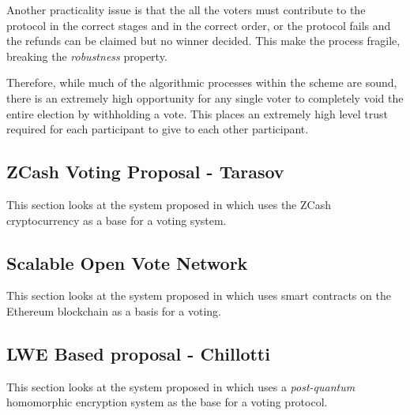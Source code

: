 Another practicality issue is that the all the voters must contribute to the protocol in the correct stages and in the correct order, or the protocol fails and the refunds can be claimed but no winner decided. This make the process fragile, breaking the \emph{robustness} property.

Therefore, while much of the algorithmic processes within the scheme are sound, there is an extremely high opportunity for any single voter to completely void the entire election by withholding a vote. This places an extremely high level trust required for each participant to give to each other participant.

\subsection{ZCash Voting Proposal - Tarasov}

This section looks at the system proposed in \cite{tarasovInternetVotingUsing2017} which uses the ZCash cryptocurrency as a base for a voting system.




\subsection{Scalable Open Vote Network}

This section looks at the system proposed in \cite{seifelnasrScalableOpenVoteNetwork2020} which uses smart contracts on the Ethereum blockchain as a basis for a voting.


\subsection{LWE Based proposal - Chillotti}

This section looks at the system proposed in \cite{chillottiHomomorphicLWEBased} which uses a \emph{post-quantum} homomorphic encryption system as the base for a voting protocol.

